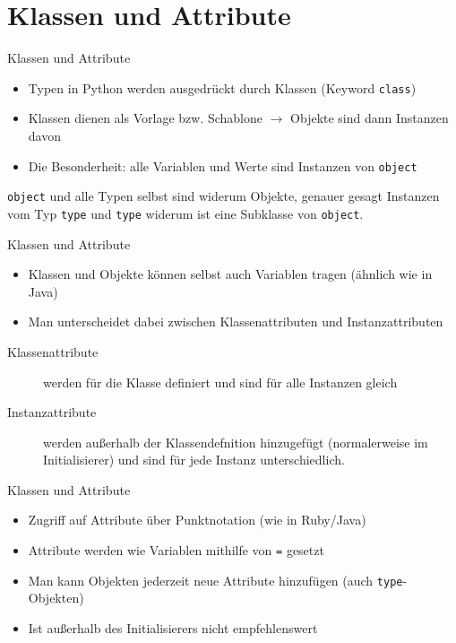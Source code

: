 \section{Klassen und Attribute}
\begin{frame}[fragile]{Klassen und Attribute}
	\begin{itemize}
		\item Typen in Python werden ausgedrückt durch Klassen (Keyword \alert{\texttt{class}})
		\item Klassen dienen als Vorlage bzw. Schablone $\rightarrow$ Objekte sind dann Instanzen davon
		\item Die Besonderheit: alle Variablen und Werte sind Instanzen von \texttt{object}
	\end{itemize}
	\texttt{object} und alle Typen selbst sind widerum Objekte, genauer gesagt Instanzen vom Typ \texttt{type} und \texttt{type} widerum ist eine Subklasse von \texttt{object}.
\end{frame}

\begin{frame}[fragile]{Klassen und Attribute}
	\begin{itemize}
		\item Klassen und Objekte können selbst auch Variablen tragen (ähnlich wie in Java)
		\item Man unterscheidet dabei zwischen Klassenattributen und Instanzattributen
	\end{itemize}

	\begin{description}
		\item[Klassenattribute] werden für die Klasse definiert und sind für alle Instanzen gleich
		\item[Instanzattribute] werden außerhalb der Klassendefnition hinzugefügt (normalerweise im Initialisierer) und sind für jede Instanz unterschiedlich.
	\end{description}
\end{frame}

\begin{frame}[fragile]{Klassen und Attribute}
	\begin{itemize}
		\item Zugriff auf Attribute über Punktnotation (wie in Ruby/Java)
		\item Attribute werden wie Variablen mithilfe von \alert{\texttt{=}} gesetzt
		\item Man kann Objekten jederzeit neue Attribute hinzufügen (auch \texttt{type}-Objekten)
		\item Ist außerhalb des Initialisierers nicht empfehlenswert
	\end{itemize}
\end{frame}

